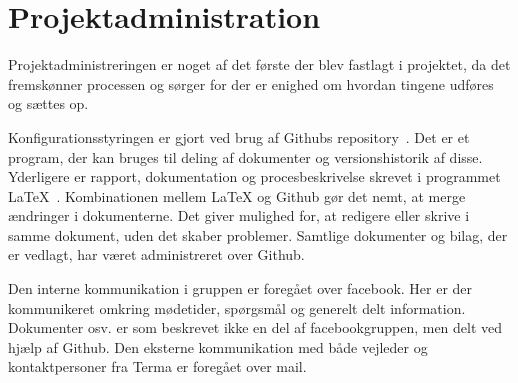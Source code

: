 \chapter{Projektadministration}
Projektadministreringen er noget af det første der blev fastlagt i projektet, da det fremskønner processen og sørger for der er enighed om hvordan tingene udføres og sættes op. 

Konfigurationsstyringen er gjort ved brug af Githubs repository~\cite{Github}. Det er et program, der kan bruges til deling af dokumenter og versionshistorik af disse. Yderligere er rapport, dokumentation og procesbeskrivelse skrevet i programmet LaTeX~\cite{Latex}. Kombinationen mellem LaTeX og Github gør det nemt, at merge ændringer i dokumenterne. Det giver mulighed for, at redigere eller skrive i samme dokument, uden det skaber problemer. Samtlige dokumenter og bilag, der er vedlagt, har været administreret over Github.  

Den interne kommunikation i gruppen er foregået over facebook. Her er der kommunikeret omkring mødetider, spørgsmål og generelt delt information. Dokumenter osv. er som beskrevet ikke en del af facebookgruppen, men delt ved hjælp af Github.
Den eksterne kommunikation med både vejleder og kontaktpersoner fra Terma er foregået over mail. 